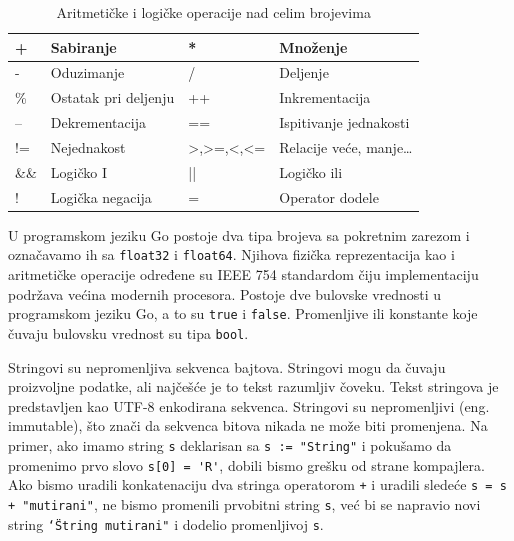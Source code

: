 \documentclass[a4paper]{article}
\begin{document}
\begin{table}[h!]
\begin{center}
\caption{Aritmetičke i logičke operacije nad celim brojevima}
\begin{tabular}{|l|l|l|l|}
\hline
+    & Sabiranje  & *                                                       & Množenje \\ \hline
-    & Oduzimanje           & /                                                       & Deljenje           \\ \hline
\%   & Ostatak pri deljenju & ++                                                      & Inkrementacija      \\ \hline
--   & Dekrementacija       & ==                                                      & Ispitivanje jednakosti \\ \hline
!=   & Nejednakost          & \textgreater{},\textgreater{}=,\textless{},\textless{}= & Relacije veće, manje…       \\ \hline
\&\& & Logičko I            & ||                                                      & Logičko ili        \\ \hline
!    & Logička negacija     & =                                                       & Operator dodele    \\ \hline
\end{tabular}
\label{tab:tabela2}

\end{center}
\end{table}

U programskom jeziku Go postoje dva tipa brojeva sa pokretnim zarezom i označavamo ih sa \texttt{float32} i \texttt{float64}. Njihova fizička reprezentacija kao i aritmetičke operacije određene su IEEE 754 standardom čiju implementaciju podržava većina modernih procesora.
Postoje dve bulovske vrednosti u programskom jeziku Go, a to su \texttt{true} i \texttt{false}. Promenljive ili konstante koje čuvaju bulovsku vrednost su tipa \texttt{bool}.

Stringovi su nepromenljiva sekvenca bajtova. Stringovi mogu da čuvaju proizvoljne podatke, ali najčešće je to tekst razumljiv čoveku. Tekst stringova je predstavljen kao UTF-8 enkodirana sekvenca.
Stringovi su nepromenljivi (eng. immutable), što znači da sekvenca bitova nikada ne može biti promenjena. Na primer, ako imamo string \texttt{s} deklarisan sa \lstinline{s := "String"} i pokušamo da promenimo prvo slovo \lstinline{s[0] = 'R'}, dobili bismo grešku od strane kompajlera. Ako bismo uradili konkatenaciju dva stringa operatorom \texttt{+} i uradili sledeće \lstinline{s = s + "mutirani"}, ne bismo promenili prvobitni string \texttt{s}, već bi se napravio novi string \texttt{\char`\"String mutirani"} i dodelio promenljivoj \texttt{s}. \cite{IntroductionToProgrammingInGo}
\end{document}
